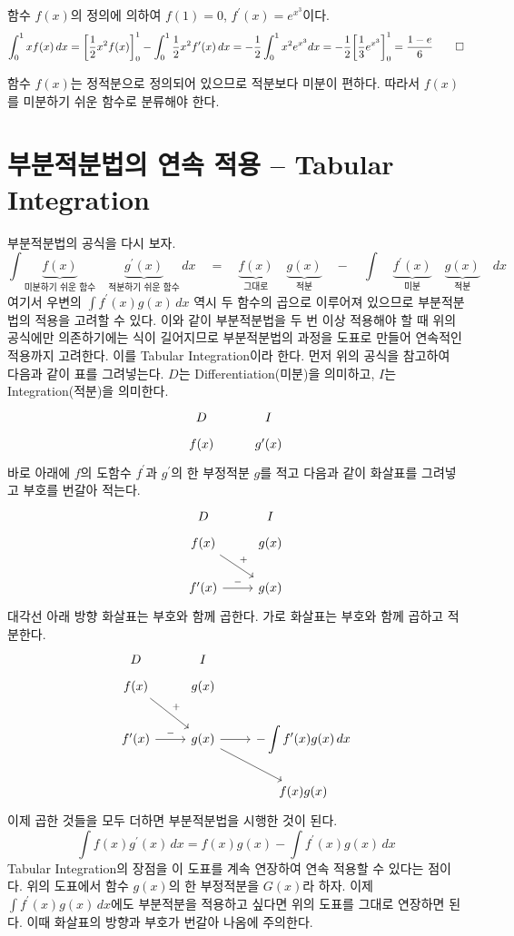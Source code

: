 \documentclass{article}
\begin{document}
\begin{sol}
	함수 $f(x)$의 정의에 의하여 $f(1)=0$, $f^{\prime}(x)=e^{x^3}$이다.
	\[
		\int_0^1xf(x)\,dx=\biggl[\frac{1}{2}x^2f(x)\biggr]_0^1-\int_0^1\frac{1}{2}x^2f^{\prime}(x)\,dx=-\frac{1}{2}\int_0^1x^2e^{x^3}dx=-\frac{1}{2}\biggl[\frac{1}{3}e^{x^3}\biggr]_0^1=\frac{1-e}{6}\qed
	\]
\end{sol}

\begin{remark}
	함수 $f(x)$는 정적분으로 정의되어 있으므로 적분보다 미분이 편하다. 따라서 $f(x)$를 미분하기 쉬운 함수로 분류해야 한다.
\end{remark}

\section{부분적분법의 연속 적용 -- Tabular Integration}
부분적분법의 공식을 다시 보자.
\[
		\int\underbrace{f(x)}_{\text{미분하기 쉬운 함수}}\quad\underbrace{g^{\prime}(x)}_{\text{적분하기 쉬운 함수}}\,dx\quad=\quad\underbrace{f(x)}_{\text{그대로}}\quad\underbrace{g(x)}_{\text{적분}}\quad-\quad\int \quad\underbrace{f^{\prime}(x)}_{\text{미분}}\quad\underbrace{g(x)}_{\text{적분}}\quad dx
\]
여기서 우변의 $\displaystyle\int f^{\prime}(x)g(x)\,dx$ 역시 두 함수의 곱으로 이루어져 있으므로 부분적분법의 적용을 고려할 수 있다. 이와 같이 부분적분법을 두 번 이상 적용해야 할 때 위의 공식에만 의존하기에는 식이 길어지므로 부분적분법의 과정을 도표로 만들어 연속적인 적용까지 고려한다. 이를 Tabular Integration이라 한다. 먼저 위의 공식을 참고하여 다음과 같이 표를 그려넣는다. $D$는 Differentiation(미분)을 의미하고, $I$는 Integration(적분)을 의미한다.
\[
	\begin{tikzcd}
		D  & I \\[-12pt]
		f(x) & g^\prime(x)
	\end{tikzcd}
\]
바로 아래에 $f$의 도함수 $f^{\prime}$과 $g^{\prime}$의 한 부정적분 $g$를 적고 다음과 같이 화살표를 그려넣고 부호를 번갈아 적는다.
\[
	\begin{tikzcd}
		D & I \\[-12pt]
		f(x) \arrow[rd, "+"] & g(x) \\
		f^\prime(x) \arrow[r, "-"] & g(x)
	\end{tikzcd}
\]
대각선 아래 방향 화살표는 부호와 함께 곱한다. 가로 화살표는 부호와 함께 곱하고 적분한다.
\[
	\begin{tikzcd}
		D & I & \\[-12pt]
		f(x) \arrow[rd, "+"] & g(x) & \\
		f^\prime(x) \arrow[r, "-"] & g(x) \arrow[r] \arrow[rd] & -\displaystyle\int f^\prime(x)g(x)\,dx \\
		& & f(x)g(x)
	\end{tikzcd}
\]
이제 곱한 것들을 모두 더하면 부분적분법을 시행한 것이 된다.
\[
	\int f(x)g^{\prime}(x)\,dx=f(x)g(x)-\int f^{\prime}(x)g(x)\,dx
\]
Tabular Integration의 장점을 이 도표를 계속 연장하여 연속 적용할 수 있다는 점이다. 위의 도표에서 함수 $g(x)$의 한 부정적분을 $G(x)$라 하자. 이제 $\displaystyle\int f^\prime(x)g(x)\,dx$에도 부분적분을 적용하고 싶다면 위의 도표를 그대로 연장하면 된다. 이때 화살표의 방향과 부호가 번갈아 나옴에 주의한다.
\end{document}
